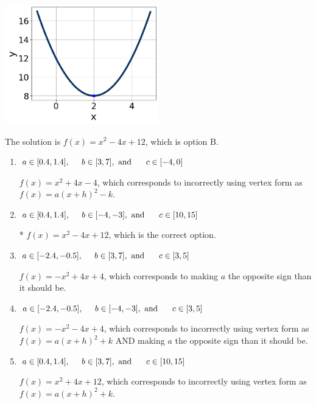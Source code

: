 \documentclass{extbook}[14pt]
\begin{document}
\begin{enumerate}
{\begin{center}
    \includegraphics[width=0.5\textwidth]{../Figures/quadraticGraphToEquationB.png}
\end{center}


The solution is \( f(x) = x^{2} -4 x + 12 \), which is option B.\begin{enumerate}[label=\Alph*.]
\item \( a \in [0.4, 1.4], \hspace*{5mm} b \in [3, 7], \text{ and } \hspace*{5mm} c \in [-4, 0] \)

$f(x)=x^{2} +4 x -4$, which corresponds to incorrectly using vertex form as $f(x) = a(x+h)^2 - k$.
\item \( a \in [0.4, 1.4], \hspace*{5mm} b \in [-4, -3], \text{ and } \hspace*{5mm} c \in [10, 15] \)

* $f(x)=x^{2} -4 x + 12$, which is the correct option.
\item \( a \in [-2.4, -0.5], \hspace*{5mm} b \in [3, 7], \text{ and } \hspace*{5mm} c \in [3, 5] \)

$f(x)=-x^{2} +4 x + 4$, which corresponds to making $a$ the opposite sign than it should be.
\item \( a \in [-2.4, -0.5], \hspace*{5mm} b \in [-4, -3], \text{ and } \hspace*{5mm} c \in [3, 5] \)

$f(x)=-x^{2} -4 x + 4$, which corresponds to incorrectly using vertex form as $f(x) = a(x+h)^2+k$ AND making $a$ the opposite sign than it should be.
\item \( a \in [0.4, 1.4], \hspace*{5mm} b \in [3, 7], \text{ and } \hspace*{5mm} c \in [10, 15] \)

$f(x)=x^{2} +4 x + 12$, which corresponds to incorrectly using vertex form as $f(x) = a(x+h)^2+k$.
\end{enumerate}

}
\end{enumerate}
\end{document}
